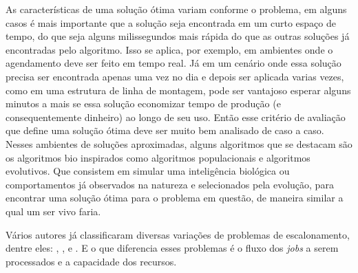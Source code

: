 \indent As características de uma solução ótima variam conforme o problema, em alguns casos é mais importante que a solução seja encontrada em um curto espaço de tempo, do que seja alguns milissegundos mais rápida do que as outras soluções já encontradas pelo algoritmo.
%
Isso se aplica, por exemplo, em ambientes onde o agendamento deve ser feito em tempo real.
%
Já em um cenário onde essa solução precisa ser encontrada apenas uma vez no dia e depois ser aplicada varias vezes, como em uma estrutura de linha de montagem, pode ser vantajoso esperar alguns minutos a mais se essa solução economizar tempo de produção (e consequentemente dinheiro) ao longo de seu uso. Então esse critério de avaliação que define uma solução ótima deve ser muito bem analisado de caso a caso.\\
\indent Nesses ambientes de soluções aproximadas, alguns algoritmos que se destacam são os algoritmos bio inspirados como algoritmos populacionais e algoritmos evolutivos. 
Que consistem em simular uma inteligência biológica ou comportamentos já observados na natureza e selecionados pela evolução, para encontrar uma solução ótima para o problema em questão, de maneira similar a qual um ser vivo faria.


Vários autores já classificaram diversas variações de problemas de escalonamento, dentre eles: \cite{graham1979}, \cite{Lenstra1979}, e \cite{maccarthy1993}. E o que diferencia esses problemas é o fluxo dos \textit{jobs} a serem processados e a capacidade dos recursos.


